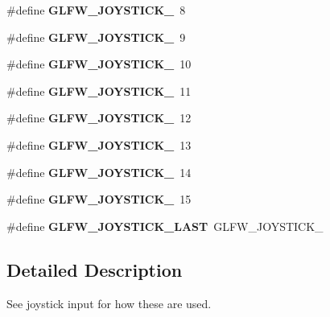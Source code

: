 \begin{DoxyCompactItemize}
\item 
\hypertarget{group__joysticks_ga87689d47df0ba6f9f5fcbbcaf7b3cecf}{}\#define {\bfseries G\+L\+F\+W\+\_\+\+J\+O\+Y\+S\+T\+I\+C\+K\+\_}~8\label{group__joysticks_ga87689d47df0ba6f9f5fcbbcaf7b3cecf}

\item 
\hypertarget{group__joysticks_gaef55389ee605d6dfc31aef6fe98c54ec}{}\#define {\bfseries G\+L\+F\+W\+\_\+\+J\+O\+Y\+S\+T\+I\+C\+K\+\_}~9\label{group__joysticks_gaef55389ee605d6dfc31aef6fe98c54ec}

\item 
\hypertarget{group__joysticks_gae7d26e3df447c2c14a569fcc18516af4}{}\#define {\bfseries G\+L\+F\+W\+\_\+\+J\+O\+Y\+S\+T\+I\+C\+K\+\_}~10\label{group__joysticks_gae7d26e3df447c2c14a569fcc18516af4}

\item 
\hypertarget{group__joysticks_gab91bbf5b7ca6be8d3ac5c4d89ff48ac7}{}\#define {\bfseries G\+L\+F\+W\+\_\+\+J\+O\+Y\+S\+T\+I\+C\+K\+\_}~11\label{group__joysticks_gab91bbf5b7ca6be8d3ac5c4d89ff48ac7}

\item 
\hypertarget{group__joysticks_ga5c84fb4e49bf661d7d7c78eb4018c508}{}\#define {\bfseries G\+L\+F\+W\+\_\+\+J\+O\+Y\+S\+T\+I\+C\+K\+\_}~12\label{group__joysticks_ga5c84fb4e49bf661d7d7c78eb4018c508}

\item 
\hypertarget{group__joysticks_ga89540873278ae5a42b3e70d64164dc74}{}\#define {\bfseries G\+L\+F\+W\+\_\+\+J\+O\+Y\+S\+T\+I\+C\+K\+\_}~13\label{group__joysticks_ga89540873278ae5a42b3e70d64164dc74}

\item 
\hypertarget{group__joysticks_ga7b02ab70daf7a78bcc942d5d4cc1dcf9}{}\#define {\bfseries G\+L\+F\+W\+\_\+\+J\+O\+Y\+S\+T\+I\+C\+K\+\_}~14\label{group__joysticks_ga7b02ab70daf7a78bcc942d5d4cc1dcf9}

\item 
\hypertarget{group__joysticks_ga453edeeabf350827646b6857df4f80ce}{}\#define {\bfseries G\+L\+F\+W\+\_\+\+J\+O\+Y\+S\+T\+I\+C\+K\+\_}~15\label{group__joysticks_ga453edeeabf350827646b6857df4f80ce}

\item 
\hypertarget{group__joysticks_ga9ca13ebf24c331dd98df17d84a4b72c9}{}\#define {\bfseries G\+L\+F\+W\+\_\+\+J\+O\+Y\+S\+T\+I\+C\+K\+\_\+\+L\+A\+S\+T}~G\+L\+F\+W\+\_\+\+J\+O\+Y\+S\+T\+I\+C\+K\+\_\label{group__joysticks_ga9ca13ebf24c331dd98df17d84a4b72c9}

\end{DoxyCompactItemize}


\subsection{Detailed Description}
See joystick input for how these are used. 